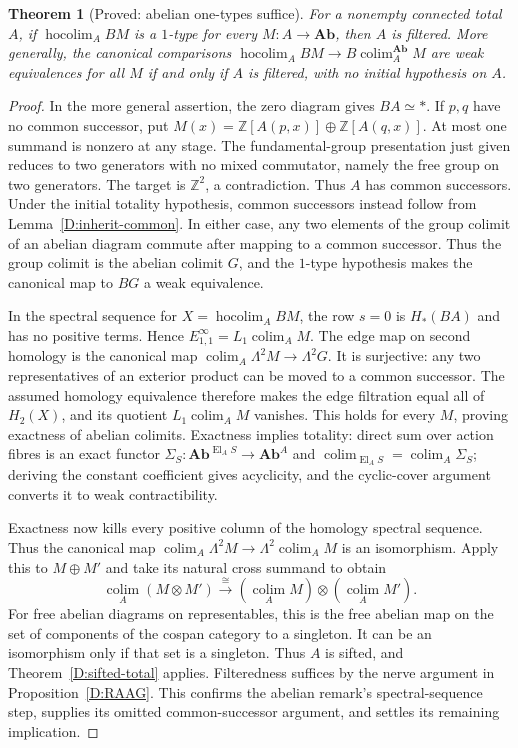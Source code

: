 \documentclass[11pt,a4paper]{article}
\newcommand{\Ab}{\mathbf{Ab}}
\newcommand{\Z}{\mathbb Z}
\newcommand{\El}{\operatorname{El}}
\newcommand{\colim}{\operatorname*{colim}}
\newcommand{\hocolim}{\operatorname*{hocolim}}
\newtheorem{theorem}{Theorem}[section]
\theoremstyle{definition}
\begin{document}
\begin{theorem}[Proved: abelian one-types suffice]\label{D:abelian-one}
For a nonempty connected total $A$, if $\hocolim_A BM$ is a
$1$-type for every $M:A\to\Ab$, then $A$ is filtered.
More generally, the canonical comparisons
$\hocolim_A BM\to B\colim_A^{\Ab}M$ are weak equivalences for
all $M$ if and only if $A$ is filtered, with no initial hypothesis
on $A$.
\end{theorem}
\begin{proof}
In the more general assertion, the zero diagram gives $BA\simeq *$.
If $p,q$ have no common successor, put
$M(x)=\Z[A(p,x)]\oplus\Z[A(q,x)]$. At most one summand is
nonzero at any stage. The fundamental-group presentation just given
reduces to two generators with no mixed commutator, namely the
free group on two generators. The target is $\Z^2$, a
contradiction. Thus $A$ has common successors. Under the initial
totality hypothesis, common successors instead follow from
Lemma~\ref{D:inherit-common}. In either case, any two elements of
the group colimit of an abelian diagram commute after mapping to
a common successor. Thus the group colimit is the abelian colimit
$G$, and the $1$-type hypothesis makes the canonical map to $BG$
a weak equivalence.

In the spectral sequence for $X=\hocolim_A BM$, the row $s=0$
is $H_*(BA)$ and has no positive terms. Hence
$E^\infty_{1,1}=L_1\colim_A M$. The edge map on second homology
is the canonical map
$\colim_A\Lambda^2 M\to\Lambda^2G$. It is surjective: any two
representatives of an exterior product can be moved to a common
successor. The assumed homology equivalence therefore makes the
edge filtration equal all of $H_2(X)$, and its quotient
$L_1\colim_A M$ vanishes. This holds for every $M$, proving
exactness of abelian colimits. Exactness implies totality: direct
sum over action fibres is an exact functor
$\Sigma_S:\Ab^{\El_A S}\to\Ab^A$ and
$\colim_{\El_A S}=\colim_A\Sigma_S$; deriving the constant
coefficient gives acyclicity, and the cyclic-cover argument
converts it to weak contractibility.

Exactness now kills every positive column of the homology spectral
sequence. Thus the canonical map
$\colim_A\Lambda^2M\to\Lambda^2\colim_A M$ is an isomorphism.
Apply this to $M\oplus M'$ and take its natural cross summand to
obtain
\[
\colim_A(M\otimes M')\xrightarrow{\cong}
(\colim_A M)\otimes(\colim_A M').
\]
For free abelian diagrams on representables, this is the free
abelian map on the set of components of the cospan category to a
singleton. It can be an isomorphism only if that set is a singleton.
Thus $A$ is sifted, and Theorem~\ref{D:sifted-total} applies.
Filteredness suffices by the nerve argument in
Proposition~\ref{D:RAAG}. This confirms the abelian remark's
spectral-sequence step, supplies its omitted common-successor
argument, and settles its remaining implication.
\end{proof}
\end{document}
